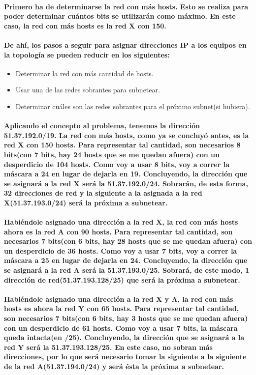 \documentclass[11pt]{article} %
\begin{document}
        \paragraph{Primero ha de determinarse la red con más hosts. Esto se realiza para poder determinar cuántos bits se utilizarán como máximo. En este caso, la red con más hosts es la red X con 150.}
        \paragraph{De ahí, los pasos a seguir para asignar direcciones IP a los equipos en la topología se pueden reducir en los siguientes:}
        \begin{itemize}
            \item Determinar la red con más cantidad de hosts.
            \item Usar una de las redes sobrantes para subnetear.
            \item Determinar cuáles son las redes sobrantes para el próximo subnet(si hubiera).
        \end{itemize}
        \paragraph{Aplicando el concepto al problema, tenemos la dirección 51.37.192.0/19. La red con más hosts, como ya se concluyó antes, es la red X con 150 hosts. Para representar tal cantidad, son necesarios 8 bits(con 7 bits, hay 24 hosts que se me quedan afuera) con un desperdicio de 104 hosts. Como voy a usar 8 bits, voy a correr la máscara a 24 en lugar de dejarla en 19. Concluyendo, la dirección que se asignará a la red X será la 51.37.192.0/24. Sobrarán, de esta forma, 32 direcciones de red y la siguiente a la asignada a la red X(51.37.193.0/24) será la próxima a subnetear.}
        \paragraph{Habiéndole asignado una dirección a la red X, la red con más hosts ahora es la red A con 90 hosts. Para representar tal cantidad, son necesarios 7 bits(con 6 bits, hay 28 hosts que se me quedan afuera) con un desperdicio de 36 hosts. Como voy a usar 7 bits, voy a correr la máscara a 25 en lugar de dejarla en 24. Concluyendo, la dirección que se asignará a la red A será la 51.37.193.0/25. Sobrará, de este modo, 1 dirección de red(51.37.193.128/25) que será la próxima a subnetear.}
        \paragraph{Habiéndole asignado una dirección a la red X y A, la red con más hosts es ahora la red Y con 65 hosts. Para representar tal cantidad, son necesarios 7 bits(con 6 bits, hay 3 hosts que se me quedan afuera) con un desperdicio de 61 hosts. Como voy a usar 7 bits, la máscara queda intacta(en /25). Concluyendo, la dirección que se asignará a la red Y será la 51.37.193.128/25. En este caso, no sobran más direcciones, por lo que será necesario tomar la siguiente a la siguiente de la red A(51.37.194.0/24) y será ésta la próxima a subnetear.}
\end{document}
